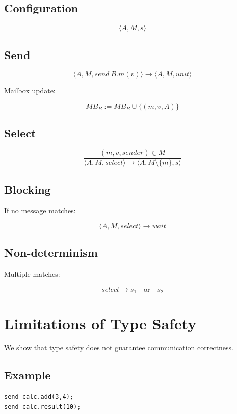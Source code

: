 \documentclass[11pt]{article}
\begin{document}
\subsection{Configuration}

\[
\langle A, M, s \rangle
\]

\subsection{Send}

\[
\langle A, M, send\ B.m(v) \rangle \rightarrow \langle A, M, unit \rangle
\]

Mailbox update:

\[
MB_B := MB_B \cup \{(m, v, A)\}
\]

\subsection{Select}

\[
\frac{
(m, v, sender) \in M
}{
\langle A, M, select \rangle \rightarrow \langle A, M \setminus \{m\}, s \rangle
}
\]

\subsection{Blocking}

If no message matches:

\[
\langle A, M, select \rangle \rightarrow wait
\]

\subsection{Non-determinism}

Multiple matches:

\[
select \rightarrow s_1 \quad \text{or} \quad s_2
\]

\section{Limitations of Type Safety}

We show that type safety does not guarantee communication correctness.

\subsection{Example}

\begin{lstlisting}
send calc.add(3,4);
send calc.result(10);
\end{lstlisting}
\end{document}
